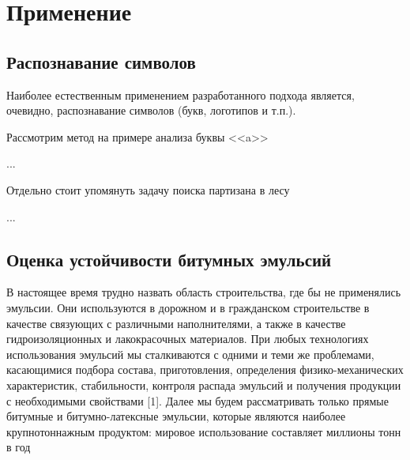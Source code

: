 \chapter{Применение} \label{chapt3}
\section{Распознавание символов}
Наиболее естественным применением разработанного подхода является, очевидно, распознавание символов (букв, логотипов и т.п.).

Рассмотрим метод на примере анализа буквы <<a>>

...

Отдельно стоит упомянуть задачу поиска партизана в лесу

...
\section{Оценка устойчивости битумных эмульсий}
В настоящее время трудно назвать область строительства, где бы не применялись эмульсии. Они используются в дорожном и в гражданском строительстве в качестве связующих с различными наполнителями, а также в качестве гидроизоляционных и лакокрасочных материалов. При любых технологиях использования эмульсий мы сталкиваются с одними и теми же проблемами, касающимися подбора состава, приготовления, определения физико-механических характеристик, стабильности, контроля распада эмульсий и получения продукции с необходимыми свойствами [1]. Далее мы будем рассматривать только прямые битумные и битумно-латексные эмульсии, которые являются наиболее крупнотоннажным продуктом: мировое использование составляет миллионы тонн в год

